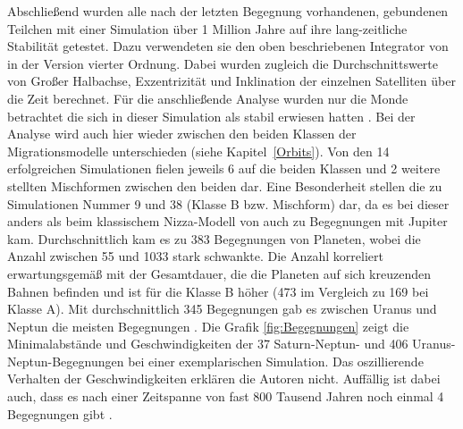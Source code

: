 \documentclass[12pt,a4paper,twoside,open=right,bibliography=totoc]{scrbook}
\renewcommand{\cite}{ \citep}
\newcommand{\refsec}[1]{siehe Kapitel~\ref{#1}}
\begin{document}
Abschließend wurden alle nach der letzten Begegnung vorhandenen, gebundenen Teilchen mit einer Simulation über 1 Million Jahre auf ihre lang-zeitliche Stabilität getestet. Dazu verwendeten sie den oben beschriebenen Integrator von \cite{Wisdom1991} in der Version vierter Ordnung.
Dabei wurden zugleich die Durchschnittswerte von Großer Halbachse, Exzentrizität und Inklination der einzelnen Satelliten über die Zeit berechnet.
Für die anschließende Analyse wurden nur die Monde betrachtet die sich in dieser Simulation als stabil erwiesen hatten\cite{Nesvorny2007}.
Bei der Analyse wird auch hier wieder zwischen den beiden Klassen der Migrationsmodelle unterschieden (\refsec{Orbits}).
Von den 14 erfolgreichen Simulationen fielen jeweils 6 auf die beiden Klassen und 2 weitere stellten Mischformen zwischen den beiden dar. Eine Besonderheit stellen die zu Simulationen Nummer 9 und 38 (Klasse B bzw. Mischform) dar, da es bei dieser anders als beim klassischem Nizza-Modell von \cite{Tsiganis2005} auch zu Begegnungen mit Jupiter kam.
Durchschnittlich kam es zu 383 Begegnungen von Planeten, wobei die Anzahl zwischen 55 und 1033 stark schwankte.
Die Anzahl korreliert erwartungsgemäß mit der Gesamtdauer, die die Planeten auf sich kreuzenden Bahnen befinden und ist für die Klasse B höher (473 im Vergleich zu 169 bei Klasse A).
Mit durchschnittlich 345 Begegnungen gab es zwischen Uranus und Neptun die meisten Begegnungen\cite{Nesvorny2007}. %
Die Grafik \ref{fig:Begegnungen} zeigt die Minimalabstände und Geschwindigkeiten der 37 Saturn-Neptun- und 406 Uranus-Neptun-Begegnungen bei einer exemplarischen Simulation.
Das oszillierende Verhalten der Geschwindigkeiten erklären die Autoren nicht.
Auffällig ist dabei auch, dass es nach einer Zeitspanne von fast 800 Tausend Jahren noch einmal 4 Begegnungen gibt\cite{Nesvorny2007}.
\end{document}
